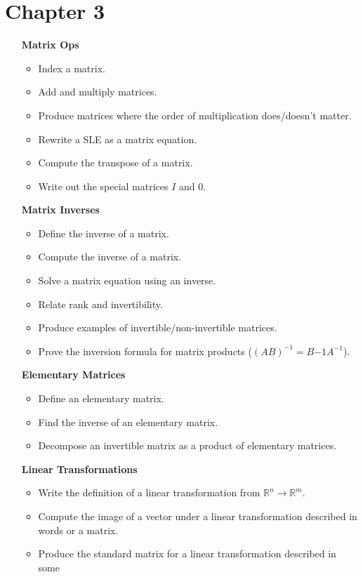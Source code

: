 \documentclass[letter]{article}
\newcommand{\R}{\mathbb{R}}
\begin{document}
	\section*{Chapter 3}
	\begin{enumerate}
		\item[\bf Matrix Ops] 
			\begin{itemize}
				\item Index a matrix.
				\item Add and multiply matrices.
				\item Produce matrices where the order of multiplication does/doesn't matter.
				\item Rewrite a SLE as a matrix equation.
				\item Compute the transpose of a matrix.
				\item Write out the special matrices $I$ and $0$.
			\end{itemize}
		\item[\bf Matrix Inverses] 
			\begin{itemize}
				\item Define the inverse of a matrix.
				\item Compute the inverse of a matrix.
				\item Solve a matrix equation using an inverse.
				\item Relate rank and invertibility.
				\item Produce examples of invertible/non-invertible matrices.
				\item Prove the inversion formula for matrix products ($(AB)^{-1}=B{-1}A^{-1}$).
			\end{itemize}
		\item[\bf Elementary Matrices] 
			\begin{itemize}
				\item Define an elementary matrix.
				\item Find the inverse of an elementary matrix.
				\item Decompose an invertible matrix as a product of elementary matrices.
			\end{itemize}
		\item[\bf Linear Transformations] 
			\begin{itemize}
				\item Write the definition of a linear transformation from $\R^n\to\R^m$.
				\item Compute the image of a vector under a linear transformation described in
					words or a matrix.
				\item Produce the standard matrix for a linear transformation described in some

\end{itemize}
\end{enumerate}
\end{document}
